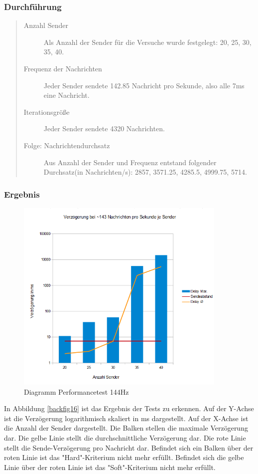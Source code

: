 \subsubsection{Durchführung}
\begin{quote}
  \begin{description}
  \item[Anzahl Sender]
  Als Anzahl der Sender für die Versuche wurde festgelegt: 20, 25, 30, 35, 40.

  \item[Frequenz der Nachrichten]
  Jeder Sender sendete 142.85 Nachricht pro Sekunde, also alle 7ms eine Nachricht.

  \item[Iterationsgröße]
  Jeder Sender sendete 4320 Nachrichten.

  \item[Folge: Nachrichtendurchsatz]
  Aus Anzahl der Sender und Frequenz entstand folgender Durchsatz(in Nachrichten/s): 2857, 3571.25, 4285.5, 4999.75, 5714.
  \end{description}
\end{quote}



\subsubsection{Ergebnis}
\begin{figure}[htH]
\centering
\includegraphics[width=0.9\textwidth]{backend/Diagramm_Performance_144hz.PNG}
\caption{Diagramm Performancetest 144Hz}
\label{backfig18}
\end{figure}
In Abbildung \ref{backfig16} ist das Ergebnis der Tests zu erkennen. 
Auf der Y-Achse ist die Verzögerung logarithmisch skaliert in ms dargestellt.
Auf der X-Achse ist die Anzahl der Sender dargestellt.
Die Balken stellen die maximale Verzögerung dar. 
Die gelbe Linie stellt die durchschnittliche Verzögerung dar.
Die rote Linie stellt die Sende-Verzögerung pro Nachricht dar.
Befindet sich ein Balken über der roten Linie ist das "Hard"-Kriterium nicht mehr erfüllt.
Befindet sich die gelbe Linie über der roten Linie ist das "Soft"-Kriterium nicht mehr erfüllt.



